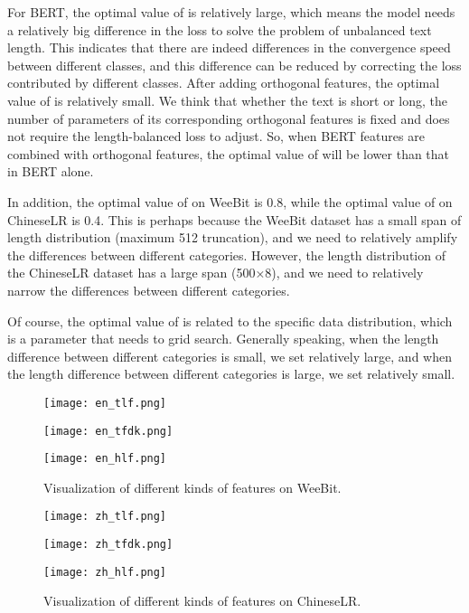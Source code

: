 \documentclass[11pt]{article}
\begin{document}
For BERT, the optimal value of  is relatively large, which means the model needs a relatively big difference in the loss to solve the problem of unbalanced text length. This indicates that there are indeed differences in the convergence speed between different classes, and this difference can be reduced by correcting the loss contributed by different classes.
After adding orthogonal features, the optimal value of  is relatively small. We think that whether the text is short or long, the number of parameters of its corresponding orthogonal features is fixed and does not require the length-balanced loss to adjust. So, when BERT features are combined with orthogonal features, the optimal value of  will be lower than that in BERT alone.


In addition, the optimal value of  on WeeBit is 0.8, while the optimal value of  on ChineseLR is 0.4. This is perhaps because the WeeBit dataset has a small span of length distribution (maximum 512 truncation), and we need to relatively amplify the differences between different categories. However, the length distribution of the ChineseLR dataset has a large span (500×8), and we need to relatively narrow the differences between different categories.


Of course, the optimal value of  is related to the specific data distribution, which is a parameter that needs to grid search.
Generally speaking, when the length difference between different categories is small, we set  relatively large, and when the length difference between different categories is large, we set  relatively small.




\begin{figure*}[!t]
\begin{minipage}[t]{0.33\linewidth}
\centering
\texttt{[image: en\_tlf.png]}
\end{minipage}
\begin{minipage}[t]{0.33\linewidth}
\centering
\texttt{[image: en\_tfdk.png]}
\end{minipage}
\begin{minipage}[t]{0.33\linewidth}
\centering
\texttt{[image: en\_hlf.png]}
\end{minipage}
\caption{Visualization of different kinds of features on WeeBit.}
\end{figure*}



\begin{figure*}[!t]
\begin{minipage}[t]{0.33\linewidth}
\centering
\texttt{[image: zh\_tlf.png]}
\end{minipage}
\begin{minipage}[t]{0.33\linewidth}
\centering
\texttt{[image: zh\_tfdk.png]}
\end{minipage}
\begin{minipage}[t]{0.33\linewidth}
\centering
\texttt{[image: zh\_hlf.png]}
\end{minipage}
\caption{Visualization of different kinds of features on ChineseLR.}
\end{figure*}
\end{document}
